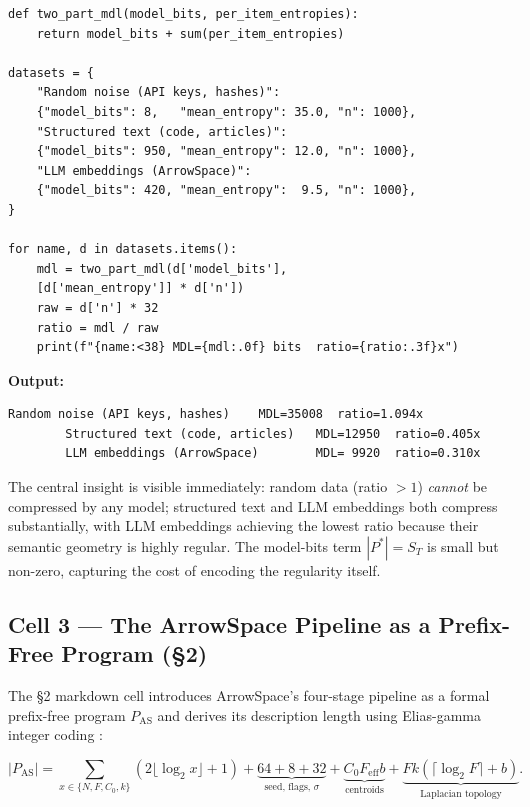 \documentclass[12pt,a4paper]{article}
\theoremstyle{plain}
\theoremstyle{definition}
\theoremstyle{remark}
\newcommand{\1}{\mathbf{1}}
\begin{document}
	\begin{lstlisting}[caption={Two-part MDL toy illustration},
		label={lst:mdltoy}]
def two_part_mdl(model_bits, per_item_entropies):
	return model_bits + sum(per_item_entropies)
	
datasets = {
	"Random noise (API keys, hashes)":
	{"model_bits": 8,   "mean_entropy": 35.0, "n": 1000},
	"Structured text (code, articles)":
	{"model_bits": 950, "mean_entropy": 12.0, "n": 1000},
	"LLM embeddings (ArrowSpace)":
	{"model_bits": 420, "mean_entropy":  9.5, "n": 1000},
}

for name, d in datasets.items():
	mdl = two_part_mdl(d['model_bits'],
	[d['mean_entropy']] * d['n'])
	raw = d['n'] * 32
	ratio = mdl / raw
	print(f"{name:<38} MDL={mdl:.0f} bits  ratio={ratio:.3f}x")
	\end{lstlisting}
	
	\noindent\textbf{Output:}
	\begin{lstlisting}[numbers=none, backgroundcolor=\color{white},
		frame=none]
		Random noise (API keys, hashes)    MDL=35008  ratio=1.094x
		Structured text (code, articles)   MDL=12950  ratio=0.405x
		LLM embeddings (ArrowSpace)        MDL= 9920  ratio=0.310x
	\end{lstlisting}
	
	The central insight is visible immediately: random data (ratio $>1$)
	\emph{cannot} be compressed by any model; structured text and LLM
	embeddings both compress substantially, with LLM embeddings achieving
	the lowest ratio because their semantic geometry is highly regular.
	The model-bits term $|P^*|=S_T$ is small but non-zero, capturing the
	cost of encoding the regularity itself.
	
	\subsection{Cell 3 --- The ArrowSpace Pipeline as a Prefix-Free Program (§2)}
	
	The §2 markdown cell introduces ArrowSpace's four-stage pipeline as a
	formal prefix-free program $P_\mathrm{AS}$ and derives its description
	length using Elias-gamma integer coding \citep{GrunwaldMDL}:
	
	\begin{equation}
		\label{eq:pas}
		|P_\mathrm{AS}|
		= \sum_{x\in\{N,F,C_0,k\}}\!\!(2\lfloor\log_2 x\rfloor+1)
		+ \underbrace{64+8+32}_{\text{seed, flags, }\sigma}
		+ \underbrace{C_0 F_\mathrm{eff} b}_{\text{centroids}}
		+ \underbrace{F k(\lceil\log_2 F\rceil + b)}_{\text{Laplacian topology}}.
	\end{equation}
	
\end{document}
